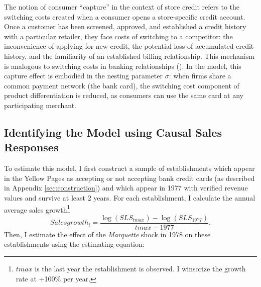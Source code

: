 \documentclass[12pt,english]{article}
\begin{document}
The notion of consumer ``capture'' in the context of store credit refers to the switching costs created when a consumer opens a store-specific credit account. Once a customer has been screened, approved, and established a credit history with a particular retailer, they face costs of switching to a competitor: the inconvenience of applying for new credit, the potential loss of accumulated credit history, and the familiarity of an established billing relationship. This mechanism is analogous to switching costs in banking relationships (\cite{klemperer_markets_1987}). In the model, this capture effect is embodied in the nesting parameter $\sigma$: when firms share a common payment network (the bank card), the switching cost component of product differentiation is reduced, as consumers can use the same card at any participating merchant.

\subsection{Identifying the Model using Causal Sales Responses}\label{sec:adoption_effects}

To estimate this model, I first construct a sample of establishments which appear in the Yellow Pages as accepting or not accepting bank credit cards (as described in Appendix \ref{sec:construction}) and which appear in 1977 with verified revenue values and survive at least 2 years. For each establishment, I calculate the annual average sales growth\footnote{$tmax$ is the last year the establishment is observed. I winsorize the growth rate at +100\% per year.}
\begin{equation*}
Salesgrowth_i = \frac{\log(SLS_{tmax}) - \log(SLS_{1977})}{tmax - 1977}.
\end{equation*} Then, I estimate the effect of the \emph{Marquette} shock in 1978 on these establishments using the estimating equation: 
\end{document}
